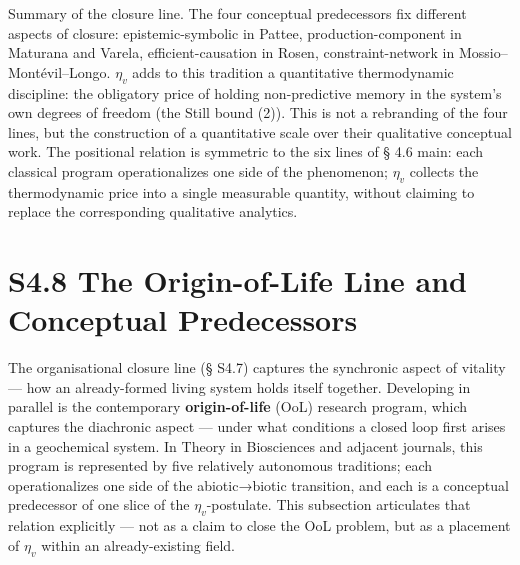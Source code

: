 \documentclass[pdflatex,sn-mathphys-ay]{sn-jnl}
\begin{document}
Summary of the closure line. The four conceptual predecessors fix different aspects of closure: epistemic-symbolic in Pattee, production-component in Maturana and Varela, efficient-causation in Rosen, constraint-network in Mossio--Montévil--Longo. \(\eta_v\) adds to this tradition a quantitative thermodynamic discipline: the obligatory price of holding non-predictive memory in the system's own degrees of freedom (the Still bound (2)). This is not a rebranding of the four lines, but the construction of a quantitative scale over their qualitative conceptual work. The positional relation is symmetric to the six lines of § 4.6 main: each classical program operationalizes one side of the phenomenon; \(\eta_v\) collects the thermodynamic price into a single measurable quantity, without claiming to replace the corresponding qualitative analytics.

\section*{S4.8 The Origin-of-Life Line and Conceptual Predecessors}\label{s4.8-the-origin-of-life-line-and-conceptual-predecessors}

The organisational closure line (§ S4.7) captures the synchronic aspect of vitality --- how an already-formed living system holds itself together. Developing in parallel is the contemporary \textbf{origin-of-life} (OoL) research program, which captures the diachronic aspect --- under what conditions a closed loop first arises in a geochemical system. In Theory in Biosciences and adjacent journals, this program is represented by five relatively autonomous traditions; each operationalizes one side of the abiotic→biotic transition, and each is a conceptual predecessor of one slice of the \(\eta_v\)-postulate. This subsection articulates that relation explicitly --- not as a claim to close the OoL problem, but as a placement of \(\eta_v\) within an already-existing field.
\end{document}

